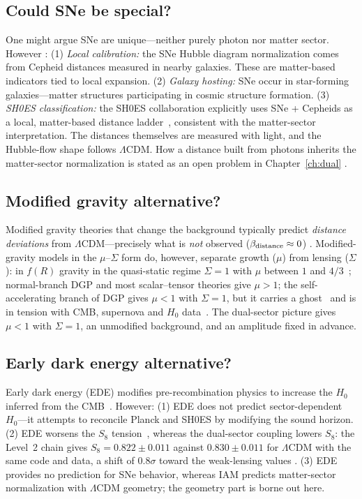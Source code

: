 \subsection{Could SNe be special?}
One might argue SNe are unique---neither purely photon nor matter sector. However \interp:
(1) \emph{Local calibration:} the SNe Hubble diagram normalization comes from Cepheid distances measured in nearby galaxies. These are matter-based
indicators tied to local expansion.
(2) \emph{Galaxy hosting:} SNe occur in star-forming galaxies---matter structures participating in cosmic structure formation.
(3) \emph{SH0ES classification:} the SH0ES collaboration explicitly uses SNe + Cepheids as a local, matter-based distance ladder~\cite{Riess2022},
consistent with the matter-sector interpretation.
The distances themselves are measured with light, and the Hubble-flow shape follows $\Lambda$CDM. How a distance built from photons inherits the
matter-sector normalization is stated as an open problem in Chapter~\ref{ch:dual} \openprob.

\subsection{Modified gravity alternative?}
Modified gravity theories that change the background typically predict \emph{distance deviations} from $\Lambda$CDM---precisely what is \emph{not} observed
($\beta_{\rm distance}\approx0$) \observed. Modified-gravity models in the $\mu$--$\Sigma$ form do, however, separate growth ($\mu$) from lensing ($\Sigma$):
in $f(R)$ gravity in the quasi-static regime $\Sigma=1$ with $\mu$ between $1$ and $4/3$~\cite{PogosianSilvestri2008}; normal-branch DGP and most
scalar--tensor theories give $\mu>1$; the self-accelerating branch of DGP gives $\mu<1$ with $\Sigma=1$, but it carries a ghost~\cite{Koyama2007} and is in
tension with CMB, supernova and $H_0$ data~\cite{Fang2008}. The dual-sector picture gives $\mu<1$ with $\Sigma=1$, an unmodified background, and an
amplitude fixed in advance.

\subsection{Early dark energy alternative?}
Early dark energy (EDE) modifies pre-recombination physics to increase the $H_0$ inferred from the CMB~\cite{Kamionkowski2023}. However:
(1) EDE does not predict sector-dependent $H_0$---it attempts to reconcile Planck and SH0ES by modifying the sound horizon.
(2) EDE worsens the $S_8$ tension~\cite{Hill2020}, whereas the dual-sector coupling lowers $S_8$: the Level~2 chain gives $S_8=0.822\pm0.011$ against
$0.830\pm0.011$ for $\Lambda$CDM with the same code and data, a shift of $0.8\sigma$ toward the weak-lensing values \measured.
(3) EDE provides no prediction for SNe behavior, whereas IAM predicts matter-sector normalization with $\Lambda$CDM geometry; the geometry part is borne out
here.

